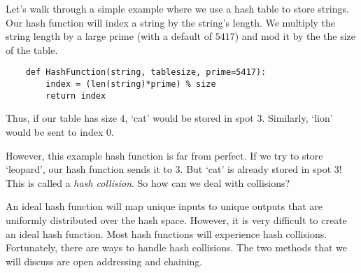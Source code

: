 Let's walk through a simple example where we use a hash table to store strings.
Our hash function will index a string by the string's length. We multiply the string length by a large prime (with a default of $5417$) and mod it by the the size of the table.
\begin{lstlisting}
    def HashFunction(string, tablesize, prime=5417):
        index = (len(string)*prime) % size
        return index
\end{lstlisting}
Thus, if our table has size $4$, `cat' would be stored in spot $3$.
Similarly, `lion' would be sent to index $0$.
\begin{center}
\end{center}

However, this example hash function is far from perfect.
If we try to store `leopard', our hash function sends it to 3.
But `cat' is already stored in spot 3!
This is called a \emph{hash collision}.
So how can we deal with collisions?
\begin{center}
\end{center}

An ideal hash function will map unique inputs to unique outputs that are uniformly distributed over the hash space.
However, it is very difficult to create an ideal hash function.
Most hash functions will experience hash collisions.
Fortunately, there are ways to handle hash collisions.
The two methods that we will discuss are open addressing and chaining.

